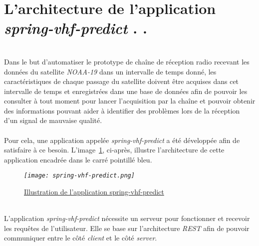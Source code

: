 \documentclass[12pt,fleqn]{book} %
\begin{document}
\section{L'architecture de l'application \emph{spring-vhf-predict}  \color{white}. .}
~\\\indent Dans le but d'automatiser le prototype de chaîne de réception radio recevant les données du satellite \emph{NOAA-19} dans un intervalle de temps donné, les caractéristiques de chaque passage du satellite doivent être acquises dans cet intervalle de temps et enregistrées dans une base de données afin de pouvoir les consulter à tout moment pour lancer l'acquisition par la chaîne et pouvoir obtenir des informations pouvant aider à identifier des problèmes lors de la réception d'un signal de mauvaise qualité.
~\\\\Pour cela, une application appelée \emph{spring-vhf-predict} a été développée afin de satisfaire à ce besoin. L'image~\underline{\color{blue}\ref{archi-spring}}, ci-après, illustre l'architecture de cette application encadrée dans le carré pointillé bleu.
~\\
\begin{figure}[H]
	\centering
	\itshape
	\texttt{[image: spring-vhf-predict.png]}
	\caption{\label{archi-spring} \underline{Illustration de l'application spring-vhf-predict}}
\end{figure}
~\\\indent L'application \emph{spring-vhf-predict} nécessite un serveur pour fonctionner et recevoir les requêtes de l'utilisateur. Elle se base sur l'architecture \emph{REST} afin de pouvoir communiquer entre le côté \emph{client} et le côté \emph{server}.
\end{document}
